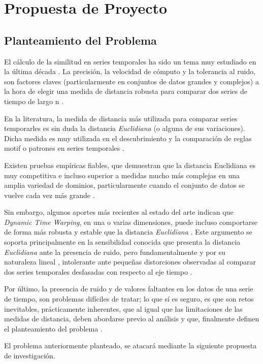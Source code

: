 \section{\textbf{Propuesta de Proyecto}}
\subsection{Planteamiento del Problema}
El c\'alculo de la similitud en series temporales ha sido un tema muy estudiado en la \'ultima d\'ecada \cite{rulediscovery}. La precisi\'on, la velocidad de c\'omputo y la tolerancia al ruido, son factores claves (particularmente en conjuntos de datos grandes y complejos) a la hora de elegir una medida de distancia robusta para comparar dos series de tiempo de largo n \cite{multidimensional}.\par
En la literatura, la medida de distancia m\'as utilizada para comparar series temporarles es sin duda la distancia \textit{Euclidiana} (o alguna de sus variaciones). Dicha medida es muy utilizada en el descubrimiento y la comparaci\'on de reglas motif o patrones en series temporales \cite{motifs}\cite{patterns}.\par
Existen pruebas emp\'iricas fiables, que demuestran que la distancia Euclidiana es muy competitiva e incluso superior a medidas mucho m\'as complejas en una amplia variedad de dominios, particularmente cuando el conjunto de datos se vuelve cada vez m\'as grande \cite{distancecomparison}\cite{timewarpingindexing}.\par
Sin embargo, algunos aportes m\'as recientes al estado del arte indican que  \textit{Dynamic Time Warping}, en una o varias dimensiones, puede incluso comportarse de forma m\'as robusta y estable que la distancia \textit{Euclidiana} \cite{keogh}. Este argumento se soporta principalmente en la sensibilidad conocida que presenta la distancia \textit{Euclidiana} ante la presencia de ruido, pero fundamentalmente y por su naturaleza lineal \cite{euclidean}, intolerante ante peque\~nas distorciones observadas al comparar dos series temporales desfasadas con respecto al eje tiempo \cite{DTWcubicsplineinterpolation}.\par
Por \'ultimo, la presencia de ruido y de valores faltantes en los datos de una serie de tiempo, son problemas dif\'iciles de tratar; lo que s\'i es seguro, es que son retos inevitables, pr\'acticamente inherentes, que al igual que las limitaciones de las medidas de distancia, deben abordarse previo al an\'alisis y que, finalmente definen el planteamiento del problema \cite{noise}.\par
El problema anteriormente planteado, se atacar\'a mediante la siguiente propuesta de investigaci\'on.
